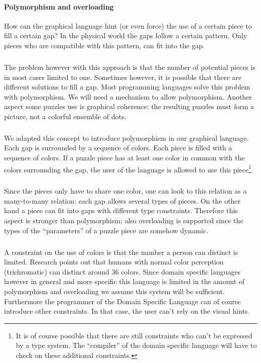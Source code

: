 \paragraph{Polymorphism and overloading}
How can the graphical language hint (or even force) the use of a certain piece
to fill a certain gap? In the physical world the gaps follow a certain pattern.
Only pieces who are compatible with this pattern, can fit into the gap.
\subparagraph{}
The problem however with this approach is that the number of potential pieces
is in most cases limited to one. Sometimes however, it is possible that there
are different solutions to fill a gap. Most programming languages solve this
problem with polymorphism. We will need a mechanism to allow polymorphism.
Another aspect some puzzles use is graphical coherence: the resulting puzzles
must form a picture, not a colorful ensemble of dots.
\subparagraph{}
We adapted this concept to introduce polymorphism in our graphical language.
Each gap is surrounded by a sequence of colors. Each piece is filled with a
sequence of colors. If a puzzle piece has at least one color in common with the
colors surrounding the gap, the user of the language is allowed to use this
piece\footnote{It is of course possible that there are still constraints who
can't be expressed by a type system. The ``compiler'' of the domain specific
language will have to check on these additional constraints.}.
\subparagraph{}
Since the pieces only have to share one color, one can look to this relation as
a many-to-many relation: each gap allows several types of pieces. On the
other hand a piece can fit into gaps with different type constraints. Therefore
this aspect is stronger than polymorphism: also overloading is supported since
the types of the ``parameters'' of a puzzle piece are somehow dynamic.
\subparagraph{}
A constraint on the use of colors is that the number a person can distinct is
limited. Research points out that humans with normal color perception
(trichromatic) can distinct around 36 colors. Since domain specific languages
however in general and more specific this language is limited in the amount of
polymorphism and overloading we assume this system will be sufficient.
Furthermore the programmer of the Domain Specific Language can of course
introduce other constraints. In that case, the user can't rely on the visual
hints.
